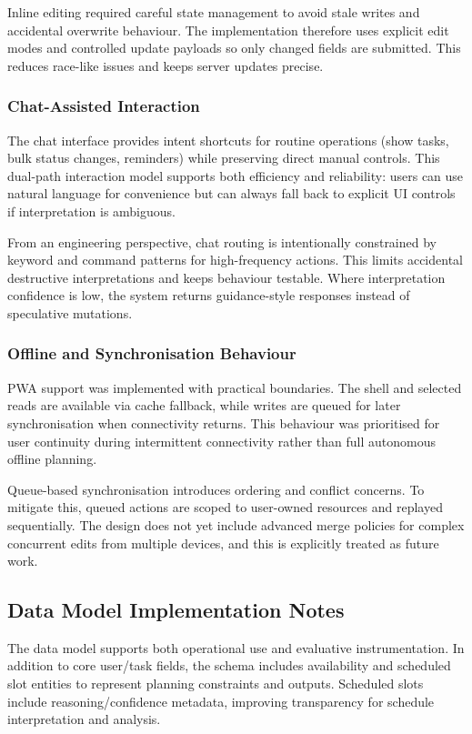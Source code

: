 \documentclass[12pt]{article}
\begin{document}
Inline editing required careful state management to avoid stale writes and accidental overwrite behaviour. The implementation therefore uses explicit edit modes and controlled update payloads so only changed fields are submitted. This reduces race-like issues and keeps server updates precise.

\subsubsection{Chat-Assisted Interaction}
The chat interface provides intent shortcuts for routine operations (show tasks, bulk status changes, reminders) while preserving direct manual controls. This dual-path interaction model supports both efficiency and reliability: users can use natural language for convenience but can always fall back to explicit UI controls if interpretation is ambiguous.

From an engineering perspective, chat routing is intentionally constrained by keyword and command patterns for high-frequency actions. This limits accidental destructive interpretations and keeps behaviour testable. Where interpretation confidence is low, the system returns guidance-style responses instead of speculative mutations.

\subsubsection{Offline and Synchronisation Behaviour}
PWA support was implemented with practical boundaries. The shell and selected reads are available via cache fallback, while writes are queued for later synchronisation when connectivity returns. This behaviour was prioritised for user continuity during intermittent connectivity rather than full autonomous offline planning.

Queue-based synchronisation introduces ordering and conflict concerns. To mitigate this, queued actions are scoped to user-owned resources and replayed sequentially. The design does not yet include advanced merge policies for complex concurrent edits from multiple devices, and this is explicitly treated as future work.

\subsection{Data Model Implementation Notes}
The data model supports both operational use and evaluative instrumentation. In addition to core user/task fields, the schema includes availability and scheduled slot entities to represent planning constraints and outputs. Scheduled slots include reasoning/confidence metadata, improving transparency for schedule interpretation and analysis.
\end{document}
